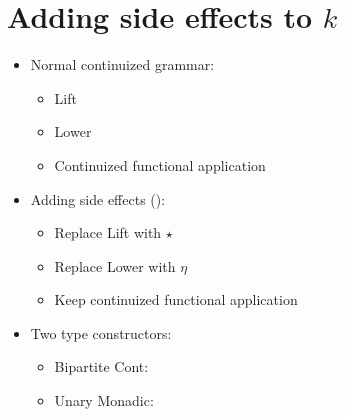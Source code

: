 \section{Adding side effects to $k$}
\begin{itemize}
	\item Normal continuized grammar:
	\begin{itemize}
		\item Lift
		\item Lower
		\item Continuized functional application
	\end{itemize}

	\item Adding side effects (\citealt{Wadler:1994, Wadler:1995, Shan:2002}): 
	\begin{itemize}
		\item Replace Lift with $\star$
		\item Replace Lower with $\eta$
		\item Keep continuized functional application
	\end{itemize}

	\item Two type constructors:
	\begin{itemize}
		\item Bipartite Cont: 
		\item Unary Monadic: 
	\end{itemize}
	
\end{itemize}


